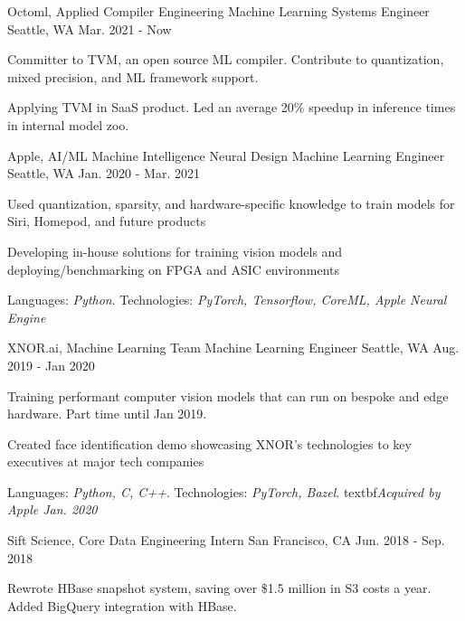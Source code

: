 \begin{cventries}
    \vspace{-0.6em}
  \cventry
    {Octoml, Applied Compiler Engineering}
    {Machine Learning Systems Engineer}
    {Seattle, WA}
    {Mar. 2021 - Now}
    {
      \begin{cvitems}
        \item {Committer to TVM, an open source ML compiler. Contribute to quantization, mixed precision, and ML framework support.}
        \item {Applying TVM in SaaS product. Led an average 20\% speedup in inference times in internal model zoo.}
	\vspace{-1em}
      \end{cvitems}
    }
   
 
  \cventry
    {Apple, AI/ML Machine Intelligence Neural Design}
    {Machine Learning Engineer}
    {Seattle, WA}
    {Jan. 2020 - Mar. 2021}
    {
      \begin{cvitems}
        \item {Used quantization, sparsity, and hardware-specific knowledge to train models for Siri, Homepod, and future products}
        \item {Developing in-house solutions for training vision models and deploying/benchmarking on FPGA and ASIC environments}
        \item {Languages: \textit{Python}. Technologies: \textit{PyTorch, Tensorflow, CoreML, Apple Neural Engine}}
	\vspace{-1em}
      \end{cvitems}
    }

  \cventry
    {XNOR.ai, Machine Learning Team}
    {Machine Learning Engineer}
    {Seattle, WA}
    {Aug. 2019 - Jan 2020}
    {
      \begin{cvitems}
        \item {Training performant computer vision models that can run on bespoke and edge hardware. Part time until Jan 2019.}
        \item {Created face identification demo showcasing XNOR's technologies to key executives at major tech companies} 
        \item {Languages: \textit{Python, C, C++}. Technologies: \textit{PyTorch, Bazel}. textbf{\textit{Acquired by Apple Jan. 2020}}}
	\vspace{-1em}
      \end{cvitems}
    }

  \cventry
    {Sift Science, Core Data}
    {Engineering Intern}
    {San Francisco, CA}
    {Jun. 2018 - Sep. 2018}
    {
      \begin{cvitems}
        \item {Rewrote HBase snapshot system, saving over \$1.5 million in S3 costs a year. Added BigQuery integration with HBase.}
      \end{cvitems}
    }


\end{cventries}
